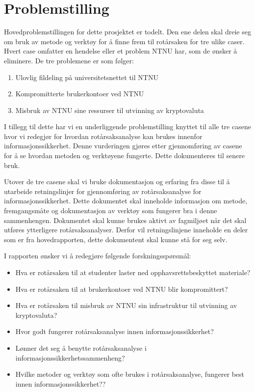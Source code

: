 \section{Problemstilling}

\label{sec:problemstilling}
Hovedproblemstillingen for dette prosjektet er todelt. Den ene delen skal dreie seg om bruk av metode og verktøy for å finne frem til rotårsaken for tre ulike caser. Hvert case omfatter en hendelse eller et problem NTNU har, som de ønsker å eliminere. De tre problemene er som følger: 

\begin{enumerate}
    \item Ulovlig fildeling på universitetsnettet til NTNU
    \item Kompromitterte brukerkontoer ved NTNU
    \item Misbruk av NTNU sine ressurser til utvinning av kryptovaluta
\end{enumerate}

I tillegg til dette har vi en underliggende problemstilling knyttet til alle tre casene hvor vi redegjør for hvordan rotårsaksanalyse kan brukes innenfor informasjonssikkerhet. Denne vurderingen gjøres etter gjennomføring av casene for å se hvordan metoden og verktøyene fungerte. Dette dokumenteres til senere bruk.

Utover de tre casene skal vi bruke dokumentasjon og erfaring fra disse til å utarbeide retningslinjer for gjennomføring av rotårsaksanalyse for informasjonssikkerhet. Dette dokumentet skal inneholde informasjon om metode, fremgangsmåte og dokumentasjon av verktøy som fungerer bra i denne sammenhengen. Dokumentet skal kunne brukes aktivt av fagmiljøet når det skal utføres ytterligere rotårsaksanalyser. Derfor vil retningslinjene inneholde en deler som er fra hovedrapporten, dette dokumentent skal kunne stå for seg selv.

I rapporten ønsker vi å redegjøre følgende forskningsspørsmål:

\begin{itemize}
    \item Hva er rotårsaken til at studenter laster ned opphavsrettsbeskyttet materiale?
    \item Hva er rotårsaken til at brukerkontoer ved NTNU blir kompromittert?
    \item Hva er rotårsaken til misbruk av NTNU sin infrastruktur til utvinning av kryptovaluta?
    \item Hvor godt fungerer rotårsaksanalyse innen informasjonssikkerhet?
    \item Lønner det seg å benytte rotårsaksanalyse i informasjonssikkerhetssammenheng?
    \item Hvilke metoder og verktøy som ofte brukes i rotårsaksanalyse, fungerer best innen informasjonssikkerhet??
\end{itemize}